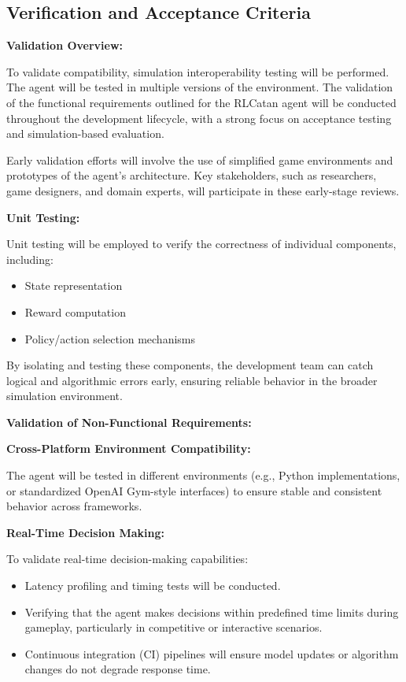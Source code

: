 \documentclass{article}
\begin{document}
\subsection{Verification and Acceptance Criteria}\label{subsec:verification-and-acceptance-criteria}

\noindent\textbf{Validation Overview:}

To validate compatibility, simulation interoperability testing will be performed. The \RL{} agent will be tested in multiple versions of the environment. The validation of the functional requirements outlined for the RLCatan agent will be conducted throughout the development lifecycle, with a strong focus on acceptance testing and simulation-based evaluation.

Early validation efforts will involve the use of simplified \emph{\Catan{}} game environments and prototypes of the \RL{} agent's architecture. Key stakeholders, such as \AI{} researchers, game designers, and domain experts, will participate in these early-stage reviews.

\vspace{1em}

\noindent\textbf{Unit Testing:}

Unit testing will be employed to verify the correctness of individual components, including:
\begin{itemize}
    \item State representation
    \item Reward computation
    \item Policy/action selection mechanisms
\end{itemize}

By isolating and testing these components, the development team can catch logical and algorithmic errors early, ensuring reliable behavior in the broader simulation environment.

\noindent\textbf{Validation of Non-Functional Requirements:}

\noindent\textbf{Cross-Platform Environment Compatibility:}

The agent will be tested in different \emph{\Catan{}} environments (e.g., Python implementations, or standardized OpenAI Gym-style interfaces) to ensure stable and consistent behavior across frameworks.

\noindent\textbf{Real-Time Decision Making:}

To validate real-time decision-making capabilities:
\begin{itemize}
    \item Latency profiling and timing tests will be conducted.
    \item Verifying that the agent makes decisions within predefined time limits during gameplay, particularly in competitive or interactive scenarios.
    \item Continuous integration (CI) pipelines will ensure model updates or algorithm changes do not degrade response time.
\end{itemize}
\end{document}
